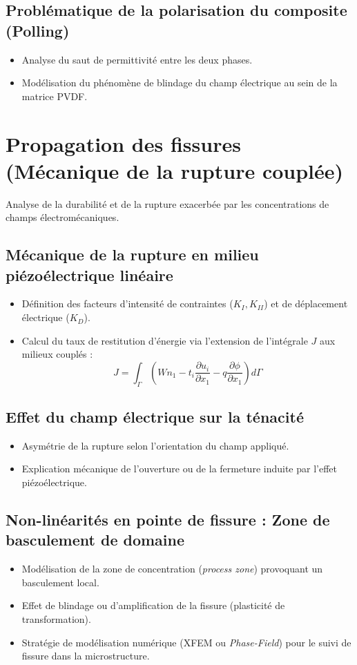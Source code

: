 \documentclass[12pt,a4paper]{article}
\begin{document}
\subsection{Problématique de la polarisation du composite (Polling)}
\begin{itemize}
    \item Analyse du saut de permittivité entre les deux phases.
    \item Modélisation du phénomène de blindage du champ électrique au sein de la matrice PVDF.
\end{itemize}

\section{Propagation des fissures (Mécanique de la rupture couplée)}

Analyse de la durabilité et de la rupture exacerbée par les concentrations de champs électromécaniques.

\subsection{Mécanique de la rupture en milieu piézoélectrique linéaire}
\begin{itemize}
    \item Définition des facteurs d'intensité de contraintes ($K_I, K_{II}$) et de déplacement électrique ($K_D$).
    \item Calcul du taux de restitution d'énergie via l'extension de l'intégrale $J$ aux milieux couplés :
    $$J = \int_{\Gamma} \left( W n_1 - t_i \frac{\partial u_i}{\partial x_1} - q \frac{\partial \phi}{\partial x_1} \right) d\Gamma$$
\end{itemize}

\subsection{Effet du champ électrique sur la ténacité}
\begin{itemize}
    \item Asymétrie de la rupture selon l'orientation du champ appliqué.
    \item Explication mécanique de l'ouverture ou de la fermeture induite par l'effet piézoélectrique.
\end{itemize}

\subsection{Non-linéarités en pointe de fissure : Zone de basculement de domaine}
\begin{itemize}
    \item Modélisation de la zone de concentration (\textit{process zone}) provoquant un basculement local.
    \item Effet de blindage ou d'amplification de la fissure (plasticité de transformation).
    \item Stratégie de modélisation numérique (XFEM ou \textit{Phase-Field}) pour le suivi de fissure dans la microstructure.
\end{itemize}
\end{document}
